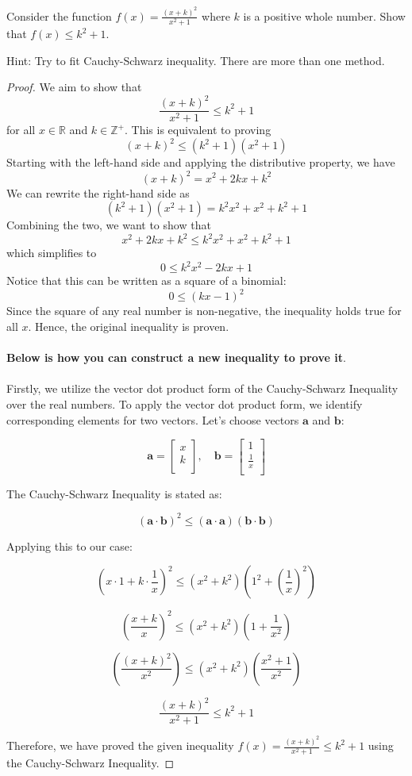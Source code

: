 \begin{exercise}
    Consider the function \( f(x) = \frac{(x+k)^2}{x^2+1} \) where \( k \) is a positive whole number. Show that \( f(x) \leq k^2 + 1 \).
\end{exercise}
Hint: Try to fit Cauchy-Schwarz inequality. There are more than one method.
\begin{proof}
    We aim to show that
    \[ \frac{(x+k)^2}{x^2+1} \leq k^2 + 1 \]
    for all \( x \in \mathbb{R} \) and \( k \in \mathbb{Z}^+ \). This is equivalent to proving
    \[ (x+k)^2 \leq (k^2 + 1)(x^2 + 1) \]
    Starting with the left-hand side and applying the distributive property, we have
    \[ (x+k)^2 = x^2 + 2kx + k^2 \]
    We can rewrite the right-hand side as
    \[ (k^2 + 1)(x^2 + 1) = k^2x^2 + x^2 + k^2 + 1 \]
    Combining the two, we want to show that
    \[ x^2 + 2kx + k^2 \leq k^2x^2 + x^2 + k^2 + 1 \]
    which simplifies to
    \[ 0 \leq k^2x^2 - 2kx + 1 \]
    Notice that this can be written as a square of a binomial:
    \[ 0 \leq (kx - 1)^2 \]
    Since the square of any real number is non-negative, the inequality holds true for all \( x \). Hence, the original inequality is proven.\\\\
\textbf{Below is how you can construct a new inequality to prove it}.\\\\
Firstly, we utilize the vector dot product form of the Cauchy-Schwarz Inequality over the real numbers. To apply the vector dot product form, we identify corresponding elements for two vectors. Let's choose vectors \( \mathbf{a} \) and \( \mathbf{b} \):

\[
\mathbf{a} = \begin{bmatrix}
x \\
k \\
\end{bmatrix}, \quad \mathbf{b} = \begin{bmatrix}
1 \\
\frac{1}{x} \\
\end{bmatrix}
\]

The Cauchy-Schwarz Inequality is stated as:

\[
(\mathbf{a} \cdot \mathbf{b})^2 \leq (\mathbf{a} \cdot \mathbf{a})(\mathbf{b} \cdot \mathbf{b})
\]

Applying this to our case:

\[
\left( x \cdot 1 + k \cdot \frac{1}{x} \right)^2 \leq (x^2 + k^2)\left( 1^2 + \left(\frac{1}{x}\right)^2 \right)
\]

\[
\left( \frac{x + k}{x} \right)^2 \leq (x^2 + k^2)\left( 1 + \frac{1}{x^2} \right)
\]

\[
\left(\frac{(x+k)^2}{x^2}\right) \leq (x^2 + k^2)\left( \frac{x^2+1}{x^2} \right)
\]

\[
\frac{(x+k)^2}{x^2+1} \leq k^2 + 1
\]

Therefore, we have proved the given inequality \( f(x) = \frac{(x+k)^2}{x^2+1} \leq k^2 + 1 \) using the Cauchy-Schwarz Inequality.

\end{proof}
